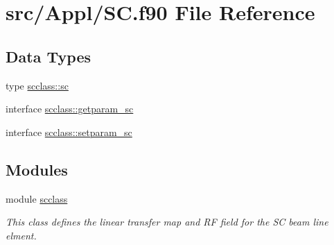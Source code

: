 \hypertarget{_s_c_8f90}{}\section{src/\+Appl/\+SC.f90 File Reference}
\label{_s_c_8f90}
\subsection*{Data Types}
\begin{DoxyCompactItemize}
\item 
type \mbox{\hyperlink{namespacescclass_structscclass_1_1sc}{scclass\+::sc}}
\item 
interface \mbox{\hyperlink{interfacescclass_1_1getparam__sc}{scclass\+::getparam\+\_\+sc}}
\item 
interface \mbox{\hyperlink{interfacescclass_1_1setparam__sc}{scclass\+::setparam\+\_\+sc}}
\end{DoxyCompactItemize}
\subsection*{Modules}
\begin{DoxyCompactItemize}
\item 
module \mbox{\hyperlink{namespacescclass}{scclass}}
\begin{DoxyCompactList}\small\item\em This class defines the linear transfer map and RF field for the SC beam line elment. \end{DoxyCompactList}\end{DoxyCompactItemize}
